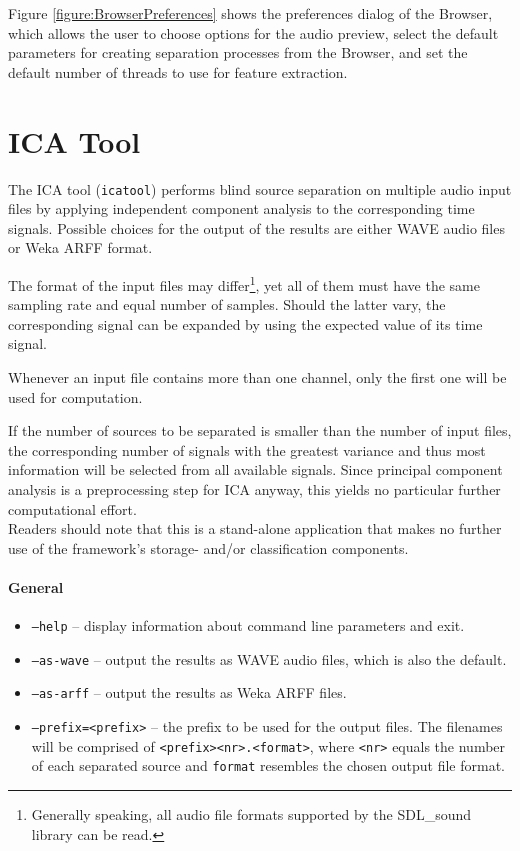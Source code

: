 Figure \ref{figure:BrowserPreferences} shows the preferences dialog of the
Browser, which allows the user to choose options for the audio preview, select
the default parameters for creating separation processes from the Browser, and
set the default number of threads to use for feature extraction.


\section{ICA Tool}

The ICA tool (\verb!icatool!) performs blind source separation on multiple audio
input files by applying independent component analysis to the corresponding time
signals. Possible choices for the output of the results are either WAVE audio
files or Weka ARFF format.

The format of the input files may differ\footnote{Generally speaking, all audio
  file formats supported by the SDL\_sound library can be read.}, yet all of them
must have the same sampling rate and equal number of samples. Should the latter
vary, the corresponding signal can be expanded by using the expected value of
its time signal.

Whenever an input file contains more than one channel, only the first one will
be used for computation.

If the number of sources to be separated is smaller than the number of input
files, the corresponding number of signals with the greatest variance and thus
most information will be selected from all available signals. Since principal
component analysis is a preprocessing step for ICA anyway, this yields no
particular further computational effort.\\

Readers should note that this is a stand-alone application that makes no further
use of the framework's storage- and/or classification components.


\paragraph{General}

\begin{itemize}
  \item {\tt --help} -- display information about command line parameters and
    exit.
  \item {\tt --as-wave} -- output the results as WAVE audio files, which is
    also the default.
  \item {\tt --as-arff} -- output the results as Weka ARFF files.
  \item {\tt --prefix=<prefix>} -- the prefix to be used for the output
    files. The filenames will be comprised of \verb!<prefix><nr>.<format>!,
    where \verb!<nr>! equals the number of each separated source and
    \verb!format!  resembles the chosen output file format.
\end{itemize}

